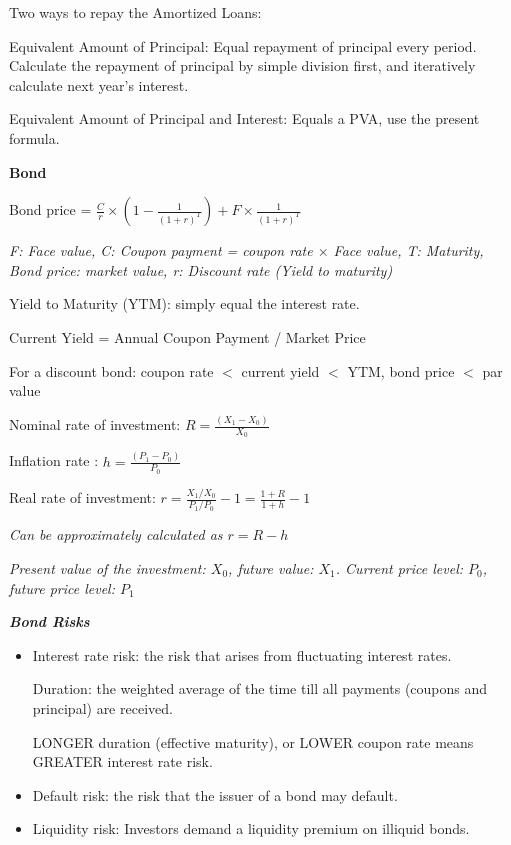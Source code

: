 \documentclass{article}
\newcommand{\bigtitle}[1]{
	\noindent
	\textbf{#1}
}
\newcommand{\smalltitle}[1]{
	\noindent
	\textbf{\textit{#1}}
}
\begin{document}
Two ways to repay the Amortized Loans:

Equivalent Amount of Principal: Equal repayment of principal every period. Calculate the repayment of principal by simple division first, and iteratively calculate next year's interest.

Equivalent Amount of Principal and Interest: Equals a PVA, use the present formula.





\bigtitle{Bond}

Bond price = $\frac{C}{r}\times(1-\frac{1}{(1+r)^{T}})+F\times\frac{1}{(1+r)^{T}}$

\textit{F: Face value, C: Coupon payment = coupon rate $\times$ Face value, T: Maturity, Bond price: market value, r: Discount rate (Yield to maturity)}

Yield to Maturity (YTM): simply equal the interest rate.



Current Yield = Annual Coupon Payment / Market Price

For a discount bond: 
coupon rate $<$ current yield $<$ YTM, bond price $<$ par value

Nominal rate of investment: $R = \frac{(X_1 - X_0)}{X_0} $

Inflation rate : $h = \frac{(P_1 - P_0)}{P_0}$

Real rate of investment: $r = \frac{X_1/X_0}{P_1/P_0} - 1 = \frac{1+R}{1+h} -1$

\textit{Can be approximately calculated as $ r = R - h$}

\textit{Present value of the investment: $X_0$, future value: $X_1$. Current price level: $P_0$, future price level: $P_1$}

\smalltitle{Bond Risks}

\begin{itemize}
	\item Interest rate risk: the risk that arises from fluctuating interest rates.
	
	Duration: the weighted average of the time till all payments (coupons and principal) are received.

	LONGER duration (effective maturity), or LOWER coupon rate means GREATER interest rate risk.
	
	\item Default risk: the risk that the issuer of a bond may default.
	
	\item Liquidity risk: Investors demand a liquidity premium on illiquid bonds.
\end{itemize}
\end{document}
